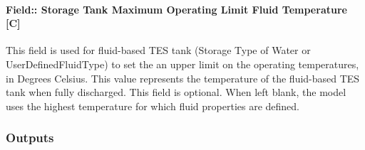 \paragraph{Field:: Storage Tank Maximum Operating Limit Fluid Temperature {[}C{]}}\label{field-storage-tank-maximum-operating-limit-fluid-temperature-c}

This field is used for fluid-based TES tank (Storage Type of Water or UserDefinedFluidType) to set the an upper limit on the operating temperatures, in Degrees Celsius. This value represents the temperature of the fluid-based TES tank when fully discharged. This field is optional. When left blank, the model uses the highest temperature for which fluid properties are defined.

\subsubsection{Outputs}\label{outputs-29}

